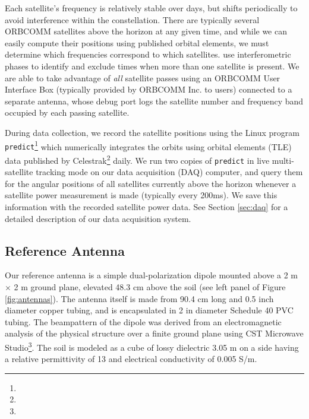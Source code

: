 Each satellite's frequency is relatively stable over days, but shifts periodically to avoid interference within the constellation. There are typically several ORBCOMM satellites above the horizon at any given time, and while we can easily compute their positions using published orbital elements, we must determine which frequencies correspond to which satellites. \citet{zheng14} use interferometric phases to identify and exclude times when more than one satellite is present. We are able to take advantage of \textit{all} satellite passes using an ORBCOMM User Interface Box (typically provided by ORBCOMM Inc. to users) connected to a separate antenna, whose debug port logs the satellite number and frequency band occupied by each passing satellite. 

During data collection, we record the satellite positions using the Linux program {\tt predict}\footnote{} which numerically integrates the orbits using orbital elements (TLE) data published by Celestrak\footnote{} daily. We run two copies of {\tt predict} in live multi-satellite tracking mode on our data acquisition (DAQ) computer, and query them for the angular positions of all satellites currently above the horizon whenever a satellite power measurement is made (typically every 200ms). We save this information with the recorded satellite power data. See Section \ref{sec:daq} for a detailed description of our data acquisition system.

\subsection{Reference Antenna}
\label{sec:refant}
Our reference antenna is a simple dual-polarization dipole mounted above a 2 m $\times$ 2 m ground plane, elevated 48.3 cm above the soil (see left panel of Figure \ref{fig:antennas}). The antenna itself is made from 90.4 cm long and 0.5 inch diameter copper tubing, and is encapsulated in 2 in diameter Schedule 40 PVC tubing. The beampattern of the dipole was derived from an electromagnetic analysis of the physical structure over a finite ground plane using CST Microwave Studio\footnote{}. The soil is modeled as a cube of lossy dielectric 3.05 m on a side having a relative permittivity of 13 and electrical conductivity of 0.005 S/m. 

